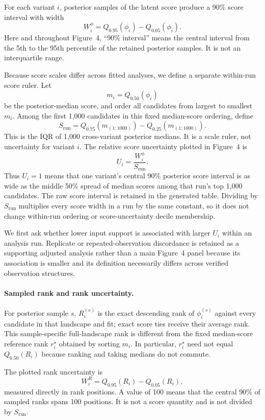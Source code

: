 \documentclass[11pt]{article}
\newcommand{\fit}{\phi}
\begin{document}
For each variant $i$, posterior samples of the latent score produce a 90\% score interval with width
\[
W_i^{\fit} = Q_{0.95}(\fit_i)-Q_{0.05}(\fit_i).
\]
Here and throughout Figure~4, ``90\% interval'' means the central interval from the 5th to the 95th percentile of the retained posterior samples. It is not an interquartile range.

Because score scales differ across fitted analyses, we define a separate within-run score ruler. Let
\[
m_i=Q_{0.50}(\fit_i)
\]
be the posterior-median score, and order all candidates from largest to smallest $m_i$. Among the first 1,000 candidates in this fixed median-score ordering, define
\[
S_{\mathrm{run}}
=Q_{0.75}\!\left(m_{(1:1000)}\right)
-Q_{0.25}\!\left(m_{(1:1000)}\right).
\]
This is the IQR of 1,000 cross-variant posterior medians. It is a scale ruler, not uncertainty for variant $i$. The relative score uncertainty plotted in Figure~4 is
\[
U_i=\frac{W_i^{\fit}}{S_{\mathrm{run}}}.
\]
Thus $U_i=1$ means that one variant's central 90\% posterior score interval is as wide as the middle 50\% spread of median scores among that run's top 1,000 candidates. The raw score interval is retained in the generated table. Dividing by $S_{\mathrm{run}}$ multiplies every score width in a run by the same constant, so it does not change within-run ordering or score-uncertainty decile membership.

We first ask whether lower input support is associated with larger $U_i$ within an analysis run. Replicate or repeated-observation discordance is retained as a supporting adjusted analysis rather than a main Figure~4 panel because its association is smaller and its definition necessarily differs across verified observation structures.

\paragraph{Sampled rank and rank uncertainty.}
For posterior sample $s$, $R_i^{(s)}$ is the exact descending rank of $\fit_i^{(s)}$ against every candidate in that landscape and fit; exact score ties receive their average rank. This sample-specific full-landscape rank is different from the fixed median-score reference rank $r_i^\star$ obtained by sorting $m_i$. In particular, $r_i^\star$ need not equal $Q_{0.50}(R_i)$ because ranking and taking medians do not commute.

The plotted rank uncertainty is
\[
W_i^R=Q_{0.95}(R_i)-Q_{0.05}(R_i),
\]
measured directly in rank positions. A value of 100 means that the central 90\% of sampled ranks spans 100 positions. It is not a score quantity and is not divided by $S_{\mathrm{run}}$.
\end{document}
